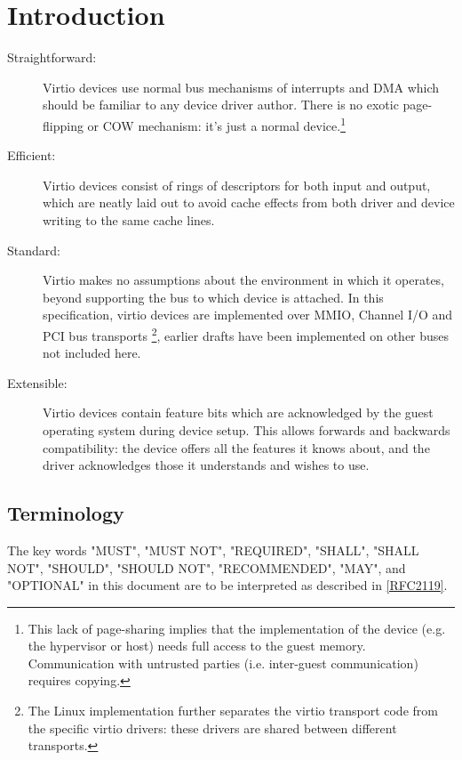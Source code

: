 \chapter{Introduction}



\begin{description}
\item[Straightforward:] Virtio devices use normal bus mechanisms of
  interrupts and DMA which should be familiar to any device driver
  author. There is no exotic page-flipping or COW mechanism: it's just
  a normal device.\footnote{This lack of page-sharing implies that the implementation of the
device (e.g. the hypervisor or host) needs full access to the
guest memory. Communication with untrusted parties (i.e.
inter-guest communication) requires copying.
}

\item[Efficient:] Virtio devices consist of rings of descriptors
  for both input and output, which are neatly laid out to avoid cache
  effects from both driver and device writing to the same cache
  lines.

\item[Standard:] Virtio makes no assumptions about the environment in which
  it operates, beyond supporting the bus to which device is attached.
  In this specification, virtio
  devices are implemented over MMIO, Channel I/O and PCI bus transports
\footnote{The Linux implementation further separates the virtio
transport code from the specific virtio drivers: these drivers are shared
between different transports.
}, earlier drafts
  have been implemented on other buses not included here.

\item[Extensible:] Virtio devices contain feature bits which are
  acknowledged by the guest operating system during device setup.
  This allows forwards and backwards compatibility: the device
  offers all the features it knows about, and the driver
  acknowledges those it understands and wishes to use.
\end{description}

\section{Terminology}\label{Terminology}

The key words "MUST", "MUST NOT", "REQUIRED", "SHALL", "SHALL NOT", "SHOULD", "SHOULD NOT", "RECOMMENDED", "MAY", and "OPTIONAL" in this document are to be interpreted as described in \hyperref[intro:rfc2119]{[RFC2119]}.

